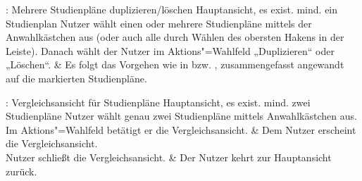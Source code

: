 \begin{usecase}{: Mehrere Studienpläne duplizieren/löschen}
	{Hauptansicht, es exist. mind. ein Studienplan}
	Nutzer wählt einen oder mehrere Studienpläne mittels der Anwahlkästchen aus (oder auch alle durch Wählen des obersten Hakens in der Leiste).
	Danach wählt der Nutzer im Aktions"=Wahlfeld „Duplizieren“ oder „Löschen“.
	& Es folgt das Vorgehen wie in  bzw. , zusammengefasst angewandt auf die markierten Studienpläne.
\end{usecase}

\begin{usecase}{: Vergleichsansicht für Studienpläne}
	{Hauptansicht, es exist. mind. zwei Studienpläne}
	Nutzer wählt genau zwei Studienpläne mittels Anwahlkästchen aus. Im Aktions"=Wahlfeld betätigt er die Vergleichsansicht.
	& Dem Nutzer erscheint die Vergleichsansicht. \\
	\hline
	Nutzer schließt die Vergleichsansicht. 
	& Der Nutzer kehrt zur Hauptansicht zurück.
\end{usecase}

